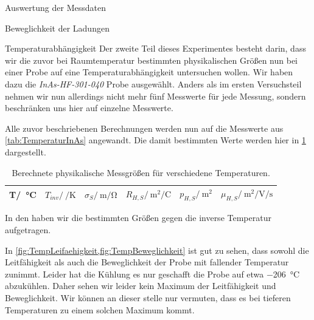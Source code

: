 \documentclass[pdftex, a4paper,11pt, twoside, ngerman]{report}
\begin{document}
\begin{chapter}{Auswertung der Messdaten}
\begin{section}{Beweglichkeit der Ladungen}
      
    \end{section}
   
   
   
    \begin{section}{Temperaturabhängigkeit}
      \label{chp:AuswertungTemperaturen}
      Der zweite Teil dieses Experimentes besteht darin, dass wir die zuvor
      bei Raumtemperatur bestimmten physikalischen Größen nun bei einer Probe
      auf eine Temperaturabhängigkeit untersuchen wollen.
      Wir haben dazu die \textit{InAs-HF-301-040} Probe ausgewählt.
      Anders als im ersten Versuchsteil nehmen wir nun allerdings nicht mehr
      fünf Messwerte für jede Messung, sondern beschränken uns hier auf einzelne
      Messwerte.
      
      Alle zuvor beschriebenen Berechnungen werden nun auf die Messwerte aus
      \cref{tab:TemperaturInAs} angewandt.
      Die damit bestimmten Werte werden hier in
      \cref{tab:TemperaturInAsResultate} dargestellt.
      
      \begin{table}[htbp]
        \centering
        \footnotesize
        \begin{tabular}{c|c|c|c|c|c}
          T/\SI{}{\celsius} & $T_{inv}/\SI{}{\per\kelvin}$ &
          $\sigma_{S}/\SI{}{\meter\per\ohm}$ &
          $R_{H,S}/\SI{}{\meter\squared\per\coulomb}$ &
          $p_{H,S}/\SI{}{\meter\squared}$ &
          $\mu_{H,S}/\SI{}{\meter\squared\per\volt\per\second}$ \\ \hline
          
        \end{tabular}
        \caption{Berechnete physikalische Messgrößen für verschiedene
            Temperaturen.}
        \label{tab:TemperaturInAsResultate}
      \end{table}
      
      In den  haben
      wir die bestimmten Größen gegen die inverse Temperatur aufgetragen.
      
      In \cref{fig:TempLeifaehigkeit,fig:TempBeweglichkeit} ist gut zu sehen,
      dass sowohl die Leitfähigkeit als auch die Beweglichkeit der Probe mit
      fallender Temperatur zunimmt.
      Leider hat die Kühlung es nur geschafft die Probe auf etwa 
      \SI{-206}{\celsius} abzukühlen.
      Daher sehen wir leider kein Maximum der Leitfähigkeit und Beweglichkeit.
      Wir können an dieser stelle nur vermuten, dass es bei tieferen
      Temperaturen zu einem solchen Maximum kommt.
      

\end{section}
\end{chapter}
\end{document}
